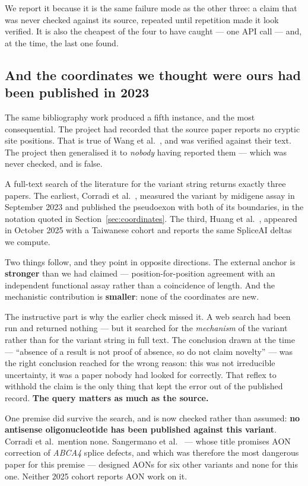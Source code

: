 \documentclass[11pt,a4paper]{article}
\begin{document}
We report it because it is the same failure mode as the other three: a claim that was never checked
against its source, repeated until repetition made it look verified. It is also the cheapest of the
four to have caught --- one API call --- and, at the time, the last one found.

\subsection{And the coordinates we thought were ours had been published in 2023}
\label{sec:novelty}

The same bibliography work produced a fifth instance, and the most consequential. The project had
recorded that the source paper reports no cryptic site positions. That is true of Wang et
al.~\cite{wang2025}, and was verified against their text. The project then generalised it to
\emph{nobody} having reported them --- which was never checked, and is false.

A full-text search of the literature for the variant string returns exactly three papers. The
earliest, Corradi et al.~\cite{corradi2023}, measured the variant by midigene assay in September
2023 and published the pseudoexon with both of its boundaries, in the notation quoted in
Section~\ref{sec:coordinates}. The third, Huang et al.~\cite{huang2025}, appeared in October 2025
with a Taiwanese cohort and reports the same SpliceAI deltas we compute.

Two things follow, and they point in opposite directions. The external anchor is \textbf{stronger}
than we had claimed --- position-for-position agreement with an independent functional assay rather
than a coincidence of length. And the mechanistic contribution is \textbf{smaller}: none of the
coordinates are new.

The instructive part is why the earlier check missed it. A web search had been run and returned
nothing --- but it searched for the \emph{mechanism} of the variant rather than for the variant
string in full text. The conclusion drawn at the time --- ``absence of a result is not proof of
absence, so do not claim novelty'' --- was the right conclusion reached for the wrong reason: this
was not irreducible uncertainty, it was a paper nobody had looked for correctly. That reflex to
withhold the claim is the only thing that kept the error out of the published record.
\textbf{The query matters as much as the source.}

One premise did survive the search, and is now checked rather than assumed: \textbf{no antisense
oligonucleotide has been published against this variant}. Corradi et al.\ mention none. Sangermano
et al.~\cite{sangermano2019} --- whose title promises AON correction of \emph{ABCA4} splice defects,
and which was therefore the most dangerous paper for this premise --- designed AONs for six other
variants and none for this one. Neither 2025 cohort reports AON work on it.
\end{document}
